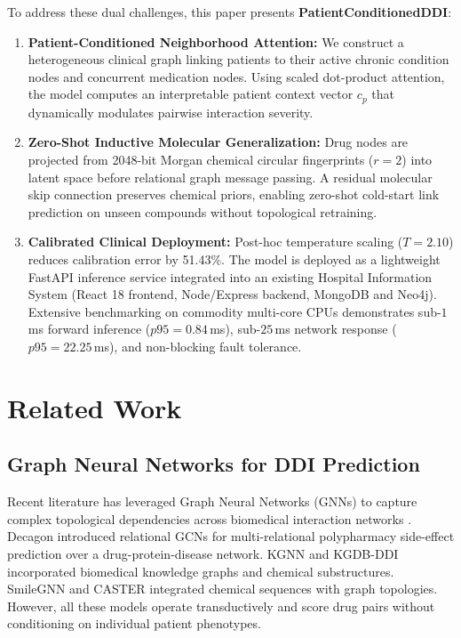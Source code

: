 \documentclass[conference]{IEEEtran}
\begin{document}
To address these dual challenges, this paper presents \textbf{PatientConditionedDDI}:
\begin{enumerate}
    \item \textbf{Patient-Conditioned Neighborhood Attention:} We construct a heterogeneous clinical graph linking patients to their active chronic condition nodes and concurrent medication nodes. Using scaled dot-product attention, the model computes an interpretable patient context vector $c_p$ that dynamically modulates pairwise interaction severity.
    \item \textbf{Zero-Shot Inductive Molecular Generalization:} Drug nodes are projected from 2048-bit Morgan chemical circular fingerprints ($r=2$) into latent space before relational graph message passing. A residual molecular skip connection preserves chemical priors, enabling zero-shot cold-start link prediction on unseen compounds without topological retraining.
    \item \textbf{Calibrated Clinical Deployment:} Post-hoc temperature scaling ($T=2.10$) reduces calibration error by 51.43\%. The model is deployed as a lightweight FastAPI inference service integrated into an existing Hospital Information System (React 18 frontend, Node/Express backend, MongoDB and Neo4j). Extensive benchmarking on commodity multi-core CPUs demonstrates sub-$1$\,ms forward inference ($p95 = 0.84$\,ms), sub-$25$\,ms network response ($p95 = 22.25$\,ms), and non-blocking fault tolerance.
\end{enumerate}

\section{Related Work}
\subsection{Graph Neural Networks for DDI Prediction}
Recent literature has leveraged Graph Neural Networks (GNNs) to capture complex topological dependencies across biomedical interaction networks \cite{kipf2017semi, velickovic2018graph, defferrard2016convolutional, zhou2020graph}. Decagon \cite{zitnik2018modeling} introduced relational GCNs for multi-relational polypharmacy side-effect prediction over a drug-protein-disease network. KGNN \cite{lin2020kgnn} and KGDB-DDI \cite{zhao2025kgdb} incorporated biomedical knowledge graphs and chemical substructures. SmileGNN \cite{han2022smilegnn} and CASTER \cite{huang2020caster} integrated chemical sequences with graph topologies. However, all these models operate transductively and score drug pairs without conditioning on individual patient phenotypes.
\end{document}
